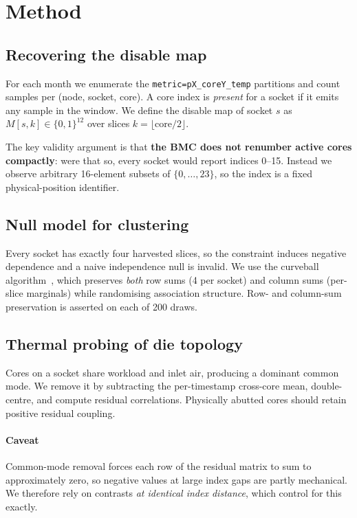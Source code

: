 \documentclass[10pt,conference]{IEEEtran}
\begin{document}
\section{Method}
\label{sec:method}
\subsection{Recovering the disable map}
For each month we enumerate the \texttt{metric=pX\_coreY\_temp} partitions and count samples per
(node, socket, core). A core index is \emph{present} for a socket if it emits any sample in the
window. We define the disable map of socket $s$ as $M[s,k]\in\{0,1\}^{12}$ over slices
$k=\lfloor \mathrm{core}/2 \rfloor$.

The key validity argument is that \textbf{the BMC does not renumber active cores compactly}: were
that so, every socket would report indices 0--15. Instead we observe arbitrary 16-element subsets
of $\{0,\dots,23\}$, so the index is a fixed physical-position identifier.

\subsection{Null model for clustering}
Every socket has exactly four harvested slices, so the constraint induces negative dependence and a
naive independence null is invalid. We use the curveball algorithm~\cite{strona2014curveball},
which preserves \emph{both} row sums (4 per socket) and column sums (per-slice marginals) while
randomising association structure. Row- and column-sum preservation is asserted on each of 200 draws.

\subsection{Thermal probing of die topology}
Cores on a socket share workload and inlet air, producing a dominant common mode. We remove it by
subtracting the per-timestamp cross-core mean, double-centre, and compute residual correlations.
Physically abutted cores should retain positive residual coupling.

\paragraph*{Caveat} Common-mode removal forces each row of the residual matrix to sum to
approximately zero, so negative values at large index gaps are partly mechanical. We therefore rely
on contrasts \emph{at identical index distance}, which control for this exactly.
\end{document}
